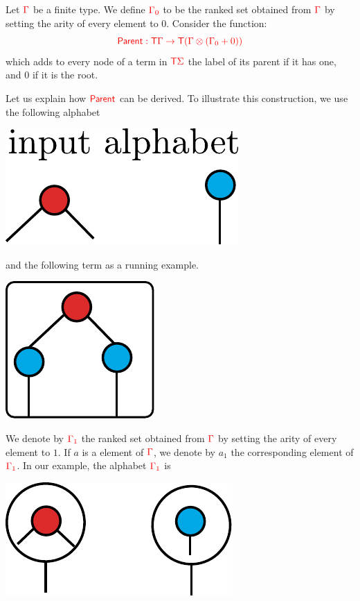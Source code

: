\noindent \begin{example}\label{ex:sibling}  Let ${\color{red}{\Gamma}}$ be a finite type. We define ${\color{red}{{\color{red}{\Gamma}}_0}}$  to be the ranked set obtained from ${\color{red}{\Gamma}}$ by setting the arity of every element to $0$.  
\medskip
Consider the function:
$${\color{red}{ \mathsf{Parent}: {\color{red}{\mathsf T}}{\color{red}{\Gamma}}\to {\color{red}{\mathsf T}}({\color{red}{\Gamma}}\otimes ({\color{red}{\Gamma}}_0+0))}}$$
which adds to every node of a term in ${\color{red}{\mathsf T}} {\color{red}{\Sigma}}$ the label  of its parent if it has one, and $0$ if it is the root.

Let us explain how ${\color{red}{\mathsf{Parent}}}$ can be derived. To illustrate this construction, we use the following alphabet
\begin{center}
		 \includegraphics[scale=.4]{parent-alphabet.pdf}
		\end{center}
and the following term as a running example.
\begin{center}
		 \includegraphics[scale=.4]{parent-example.pdf}
		\end{center}
We denote by ${\color{red}{\Gamma_1}}$ the ranked set obtained from ${\color{red}{\Gamma}}$ by setting the arity of every element to $1$. If $a$ is a element of ${\color{red}{\Gamma}}$, we denote by $a_1$ the corresponding element of ${\color{red}{\Gamma_1}}$. In our example, the alphabet ${\color{red}{\Gamma_1}}$ is
\begin{center}
		\includegraphics[scale=.4]{parent-unary-alphabet.pdf}

\end{center}
\end{example}
